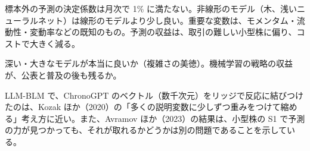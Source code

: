\begin{keybox}[まとめ]
\begin{description}[leftmargin=1em,style=nextline]
\item[確立している]
  標本外の予測の決定係数は月次で 1\% に満たない。非線形のモデル（木、浅いニューラルネット）は線形のモデルより少し良い。重要な変数は、モメンタム・流動性・変動率などの既知のもの。予測の収益は、取引の難しい小型株に偏り、コストで大きく減る。
\item[議論が続いている]
  深い・大きなモデルが本当に良いか（複雑さの美徳）。機械学習の戦略の収益が、公表と普及の後も残るか。
\end{description}
\end{keybox}

\begin{projbox}
LLM-BLM で、ChronoGPT のベクトル（数千次元）をリッジで反応に結びつけたのは、Kozak ほか（2020）の「多くの説明変数に少しずつ重みをつけて縮める」考え方に近い。また、Avramov ほか（2023）の結果は、小型株の S1 で予測の力が見つかっても、それが取れるかどうかは別の問題であることを示している。
\end{projbox}
